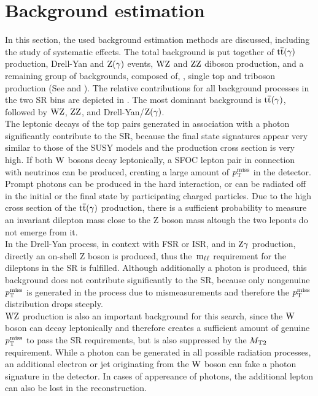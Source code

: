 \section{Background estimation}\label{sec:BKG}
In this section, the used background estimation methods are discussed, including the study of systematic effects. The total background is put together of ${\mathrm{t}\overline{\mathrm{t}}}(\gamma)$ production, Drell-Yan and $\mathrm{Z}(\gamma)$ events, $\mathrm{W}\mathrm{Z}$ and $\mathrm{Z}\mathrm{Z}$ diboson production, and a remaining group of backgrounds, composed of, \eg, single top and triboson production (See  and ). The relative contributions for all background processes in the two SR bins are depicted in . The most dominant background is ${\mathrm{t}\overline{\mathrm{t}}}(\gamma)$, followed by $\mathrm{W}\mathrm{Z}$, $\mathrm{Z}\mathrm{Z}$, and Drell-Yan/$\mathrm{Z}(\gamma)$.\\
The leptonic decays of the top pairs generated in association with a photon significantly contribute to the SR, because the final state signatures appear very similar to those of the SUSY models and the production cross section is very high. If both $\mathrm{W}$ bosons decay leptonically, a SFOC lepton pair in connection with neutrinos can be produced, creating a large amount of $p_{\mathrm{T}}^\text{miss}$ in the detector. Prompt photons can be produced in the hard interaction, or can be radiated off in the initial or the final state by participating charged particles. Due to the high cross section of the ${\mathrm{t}\overline{\mathrm{t}}}(\gamma)$ production, there is a sufficient probability to measure an invariant dilepton mass close to the Z boson mass altough the two leponts do not emerge from it.\\
In the Drell-Yan process, in context with FSR or ISR, and in $\mathrm{Z}\gamma$ production, directly an on-shell Z boson is produced, thus the $\,\text{m}_{\ell\ell}$ requirement for the dileptons in the SR is fulfilled. Although additionally a photon is produced, this background does not contribute significantly to the SR, because only nongenuine $p_{\mathrm{T}}^\text{miss}$ is generated in the process due to mismeasurements and therefore the $p_{\mathrm{T}}^\text{miss}$ distribution drops steeply.\\
$\mathrm{W}\mathrm{Z}$ production is also an important background for this search, since the $\mathrm{W}$ boson can decay leptonically and therefore creates a sufficient amount of genuine $p_{\mathrm{T}}^\text{miss}$ to pass the SR requirements, but is also suppressed by the $M_{\mathrm{T2}}$ requirement. While a photon can be generated in all possible radiation processes, an additional electron or jet originating from the $\mathrm{W}$ boson can fake a photon signature in the detector. In cases of appereance of photons, the additional lepton can also be lost in the reconstruction.\\
